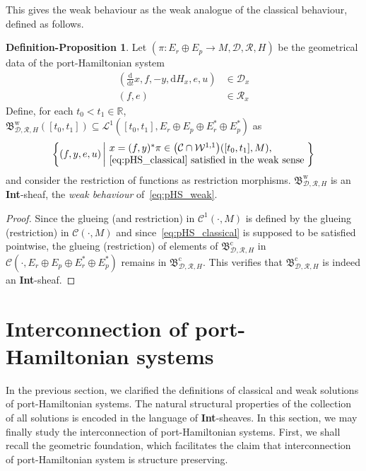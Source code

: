 \documentclass[preprint,12pt]{elsarticle}
\theoremstyle{definition}
\newtheorem{definition-proposition}[theorem]{Definition-Proposition}
\newcommand{\set}[1]{\left\lbrace #1\right\rbrace}
\begin{document}
This gives the weak behaviour as the weak analogue of the classical behaviour, defined as follows.

\begin{definition-proposition}
Let $(\pi:E_r\oplus E_p\to M,\mathcal{D},\mathcal{R},H)$ be the geometrical data of the port-Hamiltonian system
\begin{equation}\label{eq:pHS_weak}
\begin{aligned}
\left(\tfrac{\mathrm{d}}{\mathrm{d}t}x,f,-y,\mathrm{d}H_x,e,u\right) & \in\mathcal{D}_x\\
(f,e) & \in\mathcal{R}_x
\end{aligned}
\end{equation}
Define, for each $t_0<t_1\in\mathbb{R}$, $\mathfrak{B}^{\mathrm{w}}_{\mathcal{D},\mathcal{R},H}([t_0,t_1])\subseteq\mathcal{L}^1([t_0,t_1],E_r\oplus E_p\oplus E_r^*\oplus E_p^*)$ as
\begin{align*}
\set{(f,y,e,u)\left\vert\!\begin{array}{l}
x = (f,y)^*\pi\in\big(\mathcal{C}\cap\mathcal{W}^{1,1}\big)([t_0,t_1],M),\\
\eqref{eq:pHS_classical}~\mathrm{satisfied~in~the~weak~sense}
\end{array}\right.\!\!}
\end{align*}
and consider the restriction of functions as restriction morphisms. $\mathfrak{B}^{\mathrm{w}}_{\mathcal{D},\mathcal{R},H}$ is an \textbf{Int}-sheaf, the \textit{weak behaviour} of~\eqref{eq:pHS_weak}.
\end{definition-proposition}
\begin{proof}
Since the glueing (and restriction) in $\mathcal{C}^1(\cdot,M)$ is defined by the glueing (restriction) in $\mathcal{C}(\cdot,M)$ and since~\eqref{eq:pHS_classical} is supposed to be satisfied pointwise, the glueing (restriction) of elements of $\mathfrak{B}^{\mathrm{c}}_{\mathcal{D},\mathcal{R},H}$ in $\mathcal{C}(\cdot,E_r\oplus E_p\oplus E_r^*\oplus E_p^*)$ remains in $\mathfrak{B}^{\mathrm{c}}_{\mathcal{D},\mathcal{R},H}$. This verifies that $\mathfrak{B}^{\mathrm{c}}_{\mathcal{D},\mathcal{R},H}$ is indeed an \textbf{Int}-sheaf.
\end{proof}

\section{Interconnection of port-Hamiltonian systems}

In the previous section, we clarified the definitions of classical and weak solutions of port-Hamiltonian systems. The natural structural properties of the collection of all solutions is encoded in the language of \textbf{Int}-sheaves. In this section, we may finally study the interconnection of port-Hamiltonian systems. First, we shall recall the geometric foundation, which facilitates the claim that interconnection of port-Hamiltonian system is structure preserving. 
\end{document}
